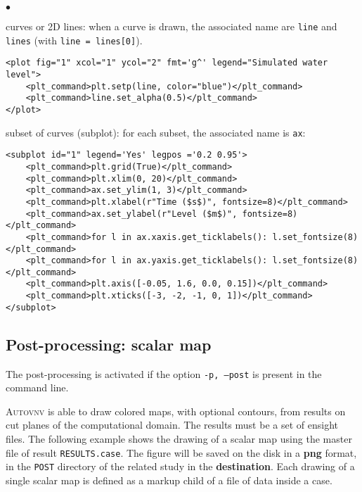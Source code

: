 \documentclass[a4paper,10pt,twoside]{csshortdoc}
\begin{document}
\begin{list}{$\bullet$}{}

\item curves or 2D lines: when a curve is drawn, the associated name
are \texttt{line} and \texttt{lines} (with \texttt{line = lines[0]}).

\small
\begin{verbatim}
<plot fig="1" xcol="1" ycol="2" fmt='g^' legend="Simulated water level">
    <plt_command>plt.setp(line, color="blue")</plt_command>
    <plt_command>line.set_alpha(0.5)</plt_command>
</plot>
\end{verbatim}
\normalsize

\item subset of curves (subplot): for each subset, the associated name is \texttt{ax}:

\small
\begin{verbatim}
<subplot id="1" legend='Yes' legpos ='0.2 0.95'>
    <plt_command>plt.grid(True)</plt_command>
    <plt_command>plt.xlim(0, 20)</plt_command>
    <plt_command>ax.set_ylim(1, 3)</plt_command>
    <plt_command>plt.xlabel(r"Time ($s$)", fontsize=8)</plt_command>
    <plt_command>ax.set_ylabel(r"Level ($m$)", fontsize=8)</plt_command>
    <plt_command>for l in ax.xaxis.get_ticklabels(): l.set_fontsize(8)</plt_command>
    <plt_command>for l in ax.yaxis.get_ticklabels(): l.set_fontsize(8)</plt_command>
    <plt_command>plt.axis([-0.05, 1.6, 0.0, 0.15])</plt_command>
    <plt_command>plt.xticks([-3, -2, -1, 0, 1])</plt_command>
</subplot>
\end{verbatim}
\normalsize


\end{list}

\subsection{Post-processing: scalar map}

The post-processing is activated if the option \texttt{-p, --post} is present
in the command line.

\textsc{Autovnv} is able to draw colored maps, with optional contours, from
results on cut planes of the computational domain. The results must be a set of
ensight files. The following example shows the drawing of a scalar map using the
master file of result \texttt{RESULTS.case}. The figure will be saved on the
disk in a \textbf{png} format, in the \texttt{POST} directory of the related
study in the \textbf{destination}. Each drawing of a single scalar map is
defined as a markup child of a file of data inside a case.
\end{document}
